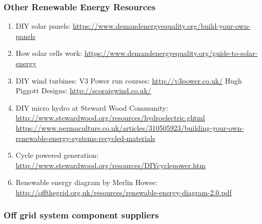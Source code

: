 \documentclass{article}
\theoremstyle{definition}
\theoremstyle{definition}
\theoremstyle{remark}
\begin{document}

  \subsubsection{Other Renewable Energy Resources} %
  \label{ssub:other_renewable_energy_resources}
  
    \begin{enumerate}[resume]
      \item DIY solar panels: \href{https://www.demandenergyequality.org/build-your-own-panels}{\underline{https://www.demandenergyequality.org/build-your-own-panels}}
      \item How solar cells work: \href{https://www.demandenergyequality.org/guide-to-solar-energy}{\underline{https://www.demandenergyequality.org/guide-to-solar-energy}}
      \item DIY wind turbines: \newline
      V3 Power run courses: \href{http://v3power.co.uk/}{\underline{http://v3power.co.uk/}} \newline
      Hugh Piggott Designs: \href{http://scoraigwind.co.uk/}{\underline{http://scoraigwind.co.uk/}}
      \item DIY micro hydro at Steward Wood Community: \newline
      \href{http://www.stewardwood.org/resources/hydroelectric.ghtml}{\underline{http://www.stewardwood.org/resources/hydroelectric.ghtml}} \newline
      \href{https://www.permaculture.co.uk/articles/310505923/building-your-own-renewable-energy-systems-recycled-materials}{\underline{https://www.permaculture.co.uk/articles/310505923/building-your-own-renewable-energy-systems-recycled-materials}}
      \item Cycle powered generation: \href{http://www.stewardwood.org/resources/DIYcyclepower.htm}{\underline{http://www.stewardwood.org/resources/DIYcyclepower.htm}}
      \item Renewable energy diagram by Merlin Howse: \newline
      \href{http://offthegrid.org.uk/resources/renewable-energy-diagram-2.0.pdf}{\underline{http://offthegrid.org.uk/resources/renewable-energy-diagram-2.0.pdf}}
    \end{enumerate}



  \subsubsection{Off grid system component suppliers} %
  \label{ssub:off_grid_system_component_suppliers}
\end{document}
